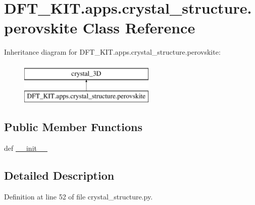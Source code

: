 \hypertarget{class_d_f_t___k_i_t_1_1apps_1_1crystal__structure_1_1perovskite}{\section{D\+F\+T\+\_\+\+K\+I\+T.\+apps.\+crystal\+\_\+structure.\+perovskite Class Reference}
\label{class_d_f_t___k_i_t_1_1apps_1_1crystal__structure_1_1perovskite}
}
Inheritance diagram for D\+F\+T\+\_\+\+K\+I\+T.\+apps.\+crystal\+\_\+structure.\+perovskite\+:\begin{figure}[H]
\begin{center}
\leavevmode
\includegraphics[height=2.000000cm]{class_d_f_t___k_i_t_1_1apps_1_1crystal__structure_1_1perovskite}
\end{center}
\end{figure}
\subsection*{Public Member Functions}
\begin{DoxyCompactItemize}
\item 
def \hyperlink{class_d_f_t___k_i_t_1_1apps_1_1crystal__structure_1_1perovskite_a8298df5110111a10afece4a7c4a0a87b}{\+\_\+\+\_\+init\+\_\+\+\_\+}
\end{DoxyCompactItemize}


\subsection{Detailed Description}


Definition at line 52 of file crystal\+\_\+structure.\+py.



